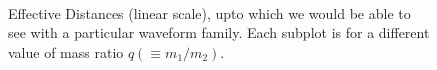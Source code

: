 \documentclass[aps,
prd,
amsmath,
amssymb,
twocolumn,
floatfix,
groupedaddress]{revtex4-1}
\def\l({\left(}
\def\r){\right)}
\begin{document}
\begin{figure}
\\ 
  \caption{Effective Distances (linear scale), upto which we would be able to see with a particular waveform family. Each subplot is for a different value of mass ratio $q \l(\equiv m_1/m_2\r)$.}
  \label{fig:DeffsLin}
\end{figure}
 
\end{document}

